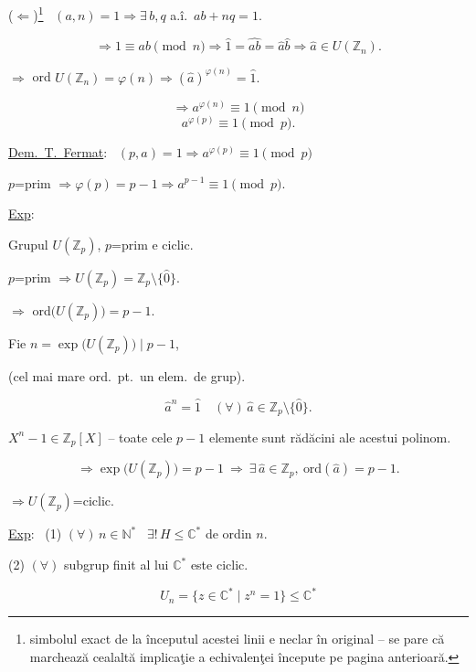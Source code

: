 \documentclass[12pt]{article}
\begin{document}
\noindent ($\Leftarrow$)\footnote{simbolul exact de la începutul acestei linii e neclar în original -- se pare că marchează cealaltă implicaţie a echivalenţei începute pe pagina anterioară.} \ $(a,n)=1 \Rightarrow \exists\,b,q$ a.î.\ $ab+nq=1$.

\[
\Rightarrow 1\equiv ab \pmod n \Rightarrow \hat 1=\widehat{ab}=\hat a\hat b \Rightarrow \hat a\in U(\mathbb{Z}_n).
\]

\bigskip
\noindent $\Rightarrow$ ord $U(\mathbb{Z}_n) = \varphi(n) \Rightarrow (\hat a)^{\varphi(n)} = \hat 1.$

\[
\Rightarrow a^{\varphi(n)} \equiv 1 \pmod n
\]
\[
a^{\varphi(p)} \equiv 1 \pmod p.
\]

\bigskip
\noindent\underline{Dem.\ T.\ Fermat}: \ $(p,a)=1 \Rightarrow a^{\varphi(p)}\equiv 1 \pmod p$

\noindent $p$=prim $\Rightarrow \varphi(p)=p-1 \Rightarrow a^{p-1}\equiv 1 \pmod p$.

\bigskip
\noindent\underline{Exp}:

\noindent Grupul $U(\mathbb{Z}_p)$, $p$=prim e ciclic.

\bigskip
\noindent $p$=prim $\Rightarrow U(\mathbb{Z}_p) = \mathbb{Z}_p\setminus\{\hat 0\}$.

\noindent $\Rightarrow$ ord$\big(U(\mathbb{Z}_p)\big)=p-1$.

\bigskip
\noindent Fie $n=\exp\big(U(\mathbb{Z}_p)\big) \mid p-1$,

\noindent \big(cel mai mare ord.\ pt.\ un elem.\ de grup\big).

\[
\hat a^n = \hat 1 \quad (\forall)\,\hat a\in\mathbb{Z}_p\setminus\{\hat 0\}.
\]

\noindent $X^n-1\in\mathbb{Z}_p[X]$ -- toate cele $p-1$ elemente sunt rădăcini ale acestui polinom.

\[
\Rightarrow \exp\big(U(\mathbb{Z}_p)\big) = p-1 \ \Rightarrow \ \exists\,\hat a\in\mathbb{Z}_p, \ \text{ord}(\hat a)=p-1.
\]

\noindent $\Rightarrow U(\mathbb{Z}_p)$=ciclic.

\bigskip
\noindent\underline{Exp}: \ (1) $(\forall)\,n\in\mathbb{N}^*$ \ $\exists!\,H\leq\mathbb{C}^*$ de ordin $n$.

\noindent (2) $(\forall)$ subgrup finit al lui $\mathbb{C}^*$ este ciclic.

\[
U_n = \{z\in\mathbb{C}^* \mid z^n=1\} \leq \mathbb{C}^*
\]
\end{document}
